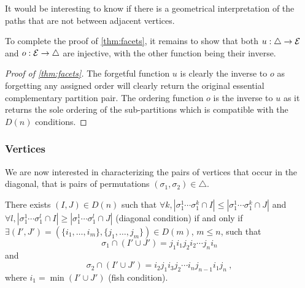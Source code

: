 \begin{rem}
    It would be interesting to know if there is a geometrical interpretation of the paths that are not between adjacent vertices. 
\end{rem}

To complete the proof of \cref{thm:facets}, it remains to show that both $u:\triangle \to \mathcal{E}$ and $o:\mathcal{E}\to \triangle$ are injective, with the other function being their inverse.

\begin{proof}[{Proof of \cref{thm:facets}}]
The forgetful function $u$ is clearly the inverse to $o$ as forgetting any assigned order will clearly return the original essential complementary partition pair. 
The ordering function $o$ is the inverse to $u$ as it returns the sole ordering of the sub-partitions which is compatible with the $D(n)$ conditions.
\end{proof}


\subsubsection{Vertices}

We are now interested in characterizing the pairs of vertices that occur in the diagonal, that is pairs of permutations $(\sigma_1,\sigma_2) \in \triangle$. 

\begin{thm} There exists $(I,J) \in D(n)$ such that $\forall k, |\sigma_1^1\cdots\sigma_1^k \cap I| \leq |\sigma_1^1\cdots\sigma_1^k \cap J|$ and $\forall l, |\sigma_1^1\cdots\sigma_1^l \cap I| \geq |\sigma_1^1\cdots\sigma_1^l \cap J|$ (diagonal condition) if and only if $\exists (I',J')=(\{i_1,\ldots,i_m\},\{j_1,\ldots,j_m\}) \in D(m)$, $m\leq n$, such that \[\sigma_1 \cap (I'\cup J')=j_1 i_1 j_2 i_2 \cdots j_n i_n \] and \[ \sigma_2 \cap (I'\cup J') = i_2 j_1 i_3 j_2 \cdots i_n j_{n-1} i_1 j_n \ , \] where $i_1 = \min (I' \cup J')$ (fish condition). 
\end{thm}

